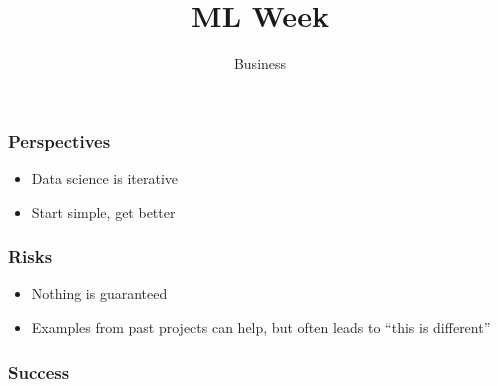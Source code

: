 
\title
{ML Week}
\subtitle{Business}




\begin{frame}
  \titlepage
\end{frame}

\begin{frame}[t]
  \frametitle{Perspectives}

  \vspace{1cm}
  \begin{itemize}
  \item Data science is iterative
  \item Start simple, get better
  \end{itemize}

\end{frame}

\begin{frame}[t]
  \frametitle{Risks}

  \vspace{1cm}
  \begin{itemize}
  \item Nothing is guaranteed
  \item Examples from past projects can help, but often leads to ``this is different''
  \end{itemize}
\end{frame}

\begin{frame}[t]
  \frametitle{Success}
  \vspace{2cm}
  \centerline{}
  \vspace{1cm}
\end{frame}

